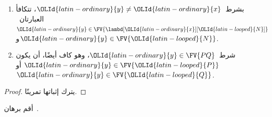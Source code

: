 \documentclass[../../../include/open-logic-section]{subfiles}
\begin{document}
\begin{lem}
  \begin{enumerate}
    \item {} بشرط~${\OLId{latin-ordinary}{y}} \neq {\OLId{latin-ordinary}{x}}$، تتكافأ العبارتان~${\OLId{latin-ordinary}{y}} \in
      \FV{\lambd[{\OLId{latin-ordinary}{x}}][{\OLId{latin-looped}{N}}]}$ و${\OLId{latin-ordinary}{y}} \in \FV{{\OLId{latin-looped}{N}}}$.
    \item {} شرط~${\OLId{latin-ordinary}{y}} \in \FV{PQ}$، وهو كاف أيضًا، أن يكون
      ${\OLId{latin-ordinary}{y}} \in \FV{{\OLId{latin-looped}{P}}}$ أو~${\OLId{latin-ordinary}{y}} \in \FV{{\OLId{latin-looped}{Q}}}$.
    \end{enumerate}
\end{lem}

\begin{proof}
  يترك إثباتها تمرينًا.
\end{proof}

\begin{prob}
  أقم برهان~.
\end{prob}
\end{document}
